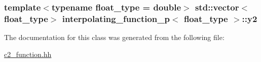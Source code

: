 \subsubsection[{\texorpdfstring{y2}{y2}}]{\setlength{\rightskip}{0pt plus 5cm}template$<$typename float\+\_\+type = double$>$ std\+::vector$<$float\+\_\+type$>$ {\bf interpolating\+\_\+function\+\_\+p}$<$ float\+\_\+type $>$\+::y2\hspace{0.3cm}{\ttfamily [protected]}}\hypertarget{classinterpolating__function__p_a7d9729f0ccd503a4eb2f1880f035805a}{}\label{classinterpolating__function__p_a7d9729f0ccd503a4eb2f1880f035805a}


The documentation for this class was generated from the following file\+:\begin{DoxyCompactItemize}
\item 
\hyperlink{c2__function_8hh}{c2\+\_\+function.\+hh}\end{DoxyCompactItemize}
